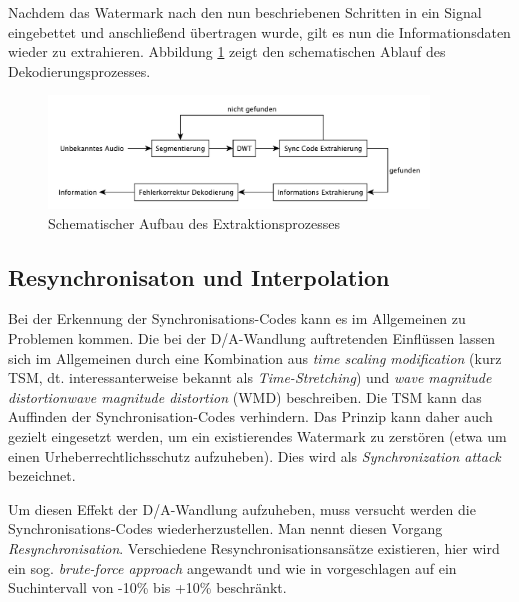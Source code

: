Nachdem das Watermark nach den nun beschriebenen Schritten in ein Signal eingebettet und anschließend übertragen wurde, gilt es nun die Informationsdaten wieder zu extrahieren. Abbildung \ref{fig:diagram-decoder} zeigt den schematischen Ablauf des Dekodierungsprozesses.

\begin{figure}[h]
	\centering
	\includegraphics[width=0.9\textwidth]{figures/diagram-decoder.pdf}
	\caption{Schematischer Aufbau des Extraktionsprozesses}
	\label{fig:diagram-decoder}
\end{figure}


\subsection{Resynchronisaton und Interpolation}

Bei der Erkennung der Synchronisations-Codes kann es im Allgemeinen zu Problemen kommen. Die bei der D/A-Wandlung auftretenden Einflüssen lassen sich im Allgemeinen durch eine Kombination aus \textit{time scaling modification} (kurz TSM, dt. interessanterweise bekannt als \textit{Time-Stretching}) und \textit{wave magnitude
distortion}\textit{wave magnitude
distortion} (WMD) beschreiben\cite{xiang2007robust}\cite{steinebach2002audio}. Die TSM kann das Auffinden der Synchronisation-Codes verhindern. Das Prinzip kann daher auch gezielt eingesetzt werden, um ein existierendes Watermark zu zerstören (etwa um einen Urheberrechtlichsschutz aufzuheben). Dies wird als \textit{Synchronization attack} bezeichnet.

Um diesen Effekt der D/A-Wandlung aufzuheben, muss versucht werden die Synchron\-isations\--Codes wieder\-herzustellen. Man nennt diesen Vorgang \textit{Resynchronisation}. Verschiedene Resynchronisationsansätze existieren, hier wird ein sog. \textit{brute-force approach} angewandt und wie in \cite{steinebach2011re} vorgeschlagen auf ein Suchintervall von -10\% bis +10\% beschränkt. 

